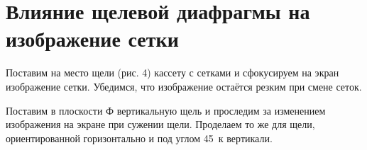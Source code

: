 \section{\label{sec:level1}Влияние щелевой диафрагмы на изображение сетки}

    Поставим на место щели (рис. 4) кассету с сетками и сфокусируем на экран изображение сетки. Убедимся, что изображение остаётся резким при смене сеток.

    Поставим в плоскости Ф вертикальную щель и проследим за изменением изображения на экране при сужении щели. Проделаем то же для щели, ориентированной горизонтально и под углом 45\textdegree~к вертикали.



